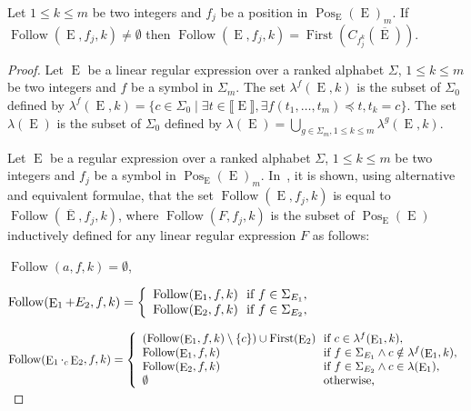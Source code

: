 \documentclass{llncs}
\def\Po#1#2{\Pos_{#1}{(#2)}}
\DeclareMathOperator{\E}{E}
\DeclareMathOperator{\First}{First}
\DeclareMathOperator{\Follow}{Follow}
\DeclareMathOperator{\Pos}{Pos}
\def\b#1{\overline{#1}}
\begin{document}
\begin{proposition}\label{prop2}
Let
  $1\leq k\leq m$ be two integers and $f_j$ be a position in $\Po{\E}{\E}_m$. If $\Follow(\E,f_j,k)\neq \emptyset$ then $\Follow(\E,f_j,k)=\First(C_{f_j^k}(\overline{\E}))$. 
 \end{proposition}
\begin{proof}

  Let $\E$ be a linear regular expression over a ranked alphabet $\Sigma$, $1\leq k\leq m$ be two integers and $f$ be a symbol in $\Sigma_m$. The set $\lambda^{f}(\E,k)$ is the subset of $\Sigma_0$ defined by $\lambda^{f}(\E,k)=\lbrace c\in\Sigma_0 \mid \exists t\in\llbracket \E\rrbracket, \exists f(t_1,\ldots,t_m)\preccurlyeq t, t_k=c\rbrace$. The set $\lambda(\E)$ is the subset of $\Sigma_0$ defined by $\lambda(\E)=\bigcup_{g\in\Sigma_m,1\leq k \leq m}\lambda^{g}(\E,k)$. 
  
  Let $\E$ be a regular expression over a ranked alphabet $\Sigma$, $1\leq k\leq m$ be two integers and $f_j$ be a symbol in $\Po{\E}{\E}_m$. In~\cite{lata}, it is shown, using alternative and equivalent formulae, that the set $\Follow(\E,f_j,k)$ is equal to $\Follow(\b\E,f_j,k)$, where $\Follow(F,f_j,k)$ is the subset of $\Po{\E}{\E}$ inductively defined for any linear regular expression $F$ as follows:
  
  \centerline{
    $\Follow(a,f,k)=\emptyset$,
  }
  
  \centerline{
    $\Follow(\E_1+E_2,f,k)=
      \left\{
        \begin{array}{l@{\ }l}
          \Follow(\E_1,f,k) & \text{ if } f\in \Sigma_{E_1},\\
          \Follow(\E_2,f,k) & \text{ if } f\in \Sigma_{E_2},\\ 
        \end{array}
      \right.$
  }
  
  \centerline{
    $\Follow(\E_1 \cdot_c \E_2,f,k)=
      \left\{
        \begin{array}{l@{\ }l}
          (\Follow(\E_1,f,k)\setminus\{c\}) \cup \First(\E_2) & \text{ if } c\in\lambda^{f}(\E_1,k),\\
          \Follow(\E_1,f,k) & \text{ if } f\in \Sigma_{E_1} \wedge c\notin\lambda^{f}(\E_1,k),\\
          \Follow(\E_2,f,k) & \text{ if } f\in \Sigma_{E_2} \wedge c\in\lambda(\E_1),\\
          \emptyset & \text{ otherwise,}
        \end{array}
      \right.$
  }
  

\end{proof}
\end{document}
